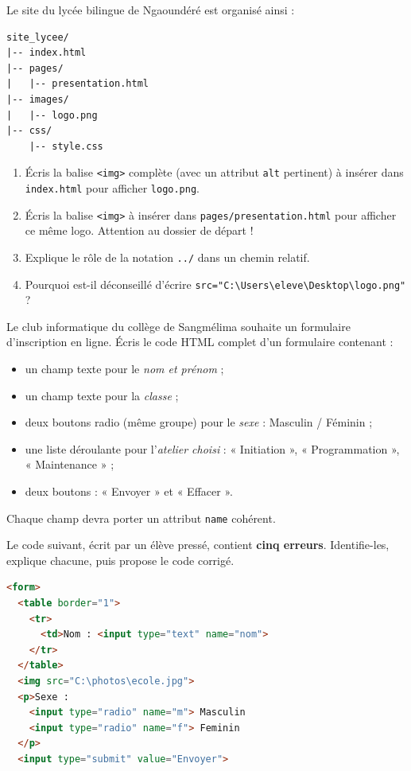 \documentclass[11pt]{article}
\begin{document}
\begin{exercice}
Le site du lycée bilingue de Ngaoundéré est organisé ainsi :
\begin{lstlisting}
site_lycee/
|-- index.html
|-- pages/
|   |-- presentation.html
|-- images/
|   |-- logo.png
|-- css/
    |-- style.css
\end{lstlisting}
\begin{enumerate}
  \item Écris la balise \texttt{<img>} complète (avec un attribut \texttt{alt} pertinent) à insérer dans \texttt{index.html} pour afficher \texttt{logo.png}.
  \item Écris la balise \texttt{<img>} à insérer dans \texttt{pages/presentation.html} pour afficher ce même logo. Attention au dossier de départ !
  \item Explique le rôle de la notation \texttt{../} dans un chemin relatif.
  \item Pourquoi est-il déconseillé d'écrire \texttt{src="C:\textbackslash Users\textbackslash eleve\textbackslash Desktop\textbackslash logo.png"} ?
\end{enumerate}
\end{exercice}

\begin{exercice}
Le club informatique du collège de Sangmélima souhaite un formulaire d'inscription en ligne. Écris le code HTML complet d'un formulaire contenant :
\begin{itemize}
  \item un champ texte pour le \emph{nom et prénom} ;
  \item un champ texte pour la \emph{classe} ;
  \item deux boutons radio (même groupe) pour le \emph{sexe} : Masculin / Féminin ;
  \item une liste déroulante pour l'\emph{atelier choisi} : « Initiation », « Programmation », « Maintenance » ;
  \item deux boutons : « Envoyer » et « Effacer ».
\end{itemize}
Chaque champ devra porter un attribut \texttt{name} cohérent.
\end{exercice}

\begin{exercice}
Le code suivant, écrit par un élève pressé, contient \textbf{cinq erreurs}. Identifie-les, explique chacune, puis propose le code corrigé.
\begin{lstlisting}[language=HTML]
<form>
  <table border="1">
    <tr>
      <td>Nom : <input type="text" name="nom">
    </tr>
  </table>
  <img src="C:\photos\ecole.jpg">
  <p>Sexe :
    <input type="radio" name="m"> Masculin
    <input type="radio" name="f"> Feminin
  </p>
  <input type="submit" value="Envoyer">
\end{lstlisting}
\end{exercice}
\end{document}
